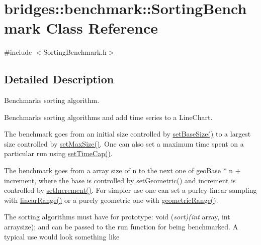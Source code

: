 \hypertarget{classbridges_1_1benchmark_1_1_sorting_benchmark}{}\section{bridges\+::benchmark\+::Sorting\+Benchmark Class Reference}
\label{classbridges_1_1benchmark_1_1_sorting_benchmark}


{\ttfamily \#include $<$Sorting\+Benchmark.\+h$>$}



\subsection{Detailed Description}
Benchmarks sorting algorithm. 

Benchmarks sorting algorithms and add time series to a Line\+Chart.

The benchmark goes from an initial size controlled by \mbox{\hyperlink{classbridges_1_1benchmark_1_1_sorting_benchmark_afe0474d148c185ed1e479ff11f42ae51}{set\+Base\+Size()}} to a largest size controlled by \mbox{\hyperlink{classbridges_1_1benchmark_1_1_sorting_benchmark_abdca289b823c7f240b648e248c07b059}{set\+Max\+Size()}}. One can also set a maximum time spent on a particular run using \mbox{\hyperlink{classbridges_1_1benchmark_1_1_sorting_benchmark_a59b95f2510d62ac5a31bb33d472fdffc}{set\+Time\+Cap()}}.

The benchmark goes from a array size of n to the next one of geo\+Base $\ast$ n + increment, where the base is controlled by \mbox{\hyperlink{classbridges_1_1benchmark_1_1_sorting_benchmark_ade76a5749b07d35b02623cce27c046ab}{set\+Geometric()}} and increment is controlled by \mbox{\hyperlink{classbridges_1_1benchmark_1_1_sorting_benchmark_ae168533dc5756f3ede3436bdd7840047}{set\+Increment()}}. For simpler use one can set a purley linear sampling with \mbox{\hyperlink{classbridges_1_1benchmark_1_1_sorting_benchmark_a993de51c8b82ec50eb186afef5dc7003}{linear\+Range()}} or a purely geometric one with \mbox{\hyperlink{classbridges_1_1benchmark_1_1_sorting_benchmark_a32fa712ee712b633aabfd7bcaa83008a}{geometric\+Range()}}.

The sorting algorithms must have for prototype\+: void ({\itshape sort)(int} array, int arraysize); and can be passed to the run function for being benchmarked. A typical use would look something like


\begin{DoxyCode}{0}
\end{DoxyCode}


